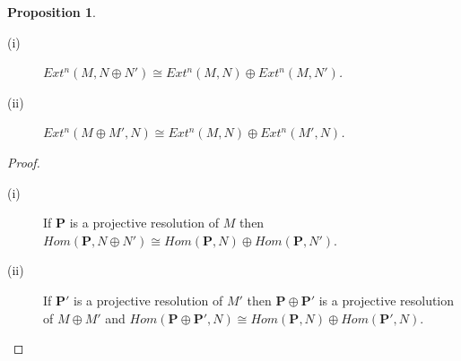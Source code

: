 \documentclass[11.5pt, twoside, a4paper, titlepage]{report}
\theoremstyle{definition}
\theoremstyle{plain}
\newtheorem{prop}[mydef]{Proposition}
\begin{document}
\begin{prop}
\begin{description}
\item [(i)] $Ext^n(M, N\oplus N') \cong Ext^n(M, N) \oplus Ext^n(M, N')$.
\item [(ii)] $Ext^n(M\oplus M', N) \cong Ext^n(M, N) \oplus Ext^n(M', N)$.
\end{description}
\end{prop}
\begin{proof}
\begin{description}
\item [(i)] If $\mathbf{P}$ is a projective resolution of $M$ then $Hom(\mathbf{P}, N\oplus N')\cong Hom(\mathbf{P}, N) \oplus Hom(\mathbf{P}, N')$.
\item [(ii)] If $\mathbf{P'}$ is a projective resolution of $M'$ then $\mathbf{P} \oplus \mathbf{P'}$ is a projective resolution of $M\oplus M'$ and $Hom(\mathbf{P} \oplus \mathbf{P'}, N) \cong Hom(\mathbf{P}, N) \oplus Hom(\mathbf{P'}, N)$.
\end{description}
\end{proof}
\end{document}
